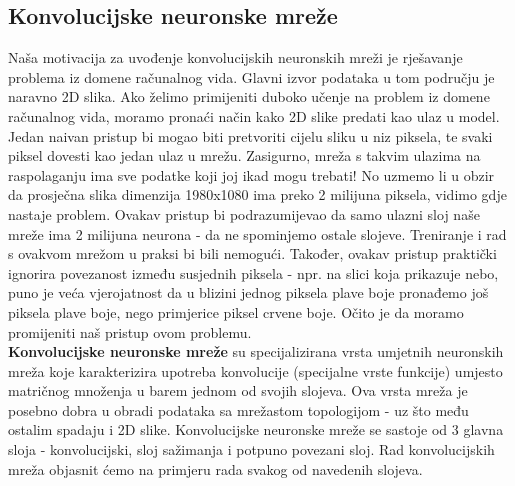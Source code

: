 \subsection{Konvolucijske neuronske mreže}
Naša motivacija za uvođenje konvolucijskih neuronskih mreži je rješavanje problema iz domene računalnog vida. Glavni izvor podataka u tom području je naravno 2D slika. Ako želimo primijeniti duboko učenje na problem iz domene računalnog vida, moramo pronaći način kako 2D slike predati kao ulaz u model. Jedan naivan pristup bi mogao biti pretvoriti cijelu sliku u niz piksela, te svaki piksel dovesti kao jedan ulaz u mrežu. Zasigurno, mreža s takvim ulazima na raspolaganju ima sve podatke koji joj ikad mogu trebati! No uzmemo li u obzir da prosječna slika dimenzija 1980x1080 ima preko 2 milijuna piksela, vidimo gdje nastaje problem. Ovakav pristup bi podrazumijevao da samo ulazni sloj naše mreže ima 2 milijuna neurona - da ne spominjemo ostale slojeve. Treniranje i rad s ovakvom mrežom  u praksi bi bili nemogući. Također, ovakav pristup praktički ignorira povezanost između susjednih piksela - npr. na slici koja prikazuje nebo, puno je veća vjerojatnost da u blizini jednog piksela plave boje pronađemo još piksela plave boje, nego primjerice piksel crvene boje. Očito je da moramo promijeniti naš pristup ovom problemu.\\

\noindent \textbf{Konvolucijske neuronske mreže}  su specijalizirana vrsta umjetnih neuronskih mreža koje karakterizira upotreba konvolucije (specijalne vrste funkcije) umjesto matričnog množenja u barem jednom od svojih slojeva. Ova vrsta mreža je posebno dobra u obradi podataka sa mrežastom topologijom - uz što među ostalim spadaju i 2D slike. \citep{deeplearningbook} Konvolucijske neuronske mreže se sastoje od 3 glavna sloja - konvolucijski, sloj sažimanja i potpuno povezani sloj. Rad konvolucijskih mreža objasnit ćemo na primjeru rada svakog od navedenih slojeva.\\

